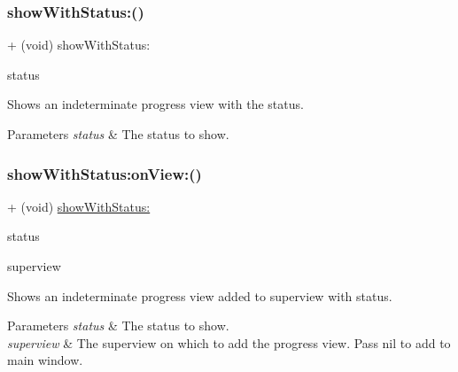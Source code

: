 \subsubsection{\texorpdfstring{show\+With\+Status\+:()}{showWithStatus:()}\hspace{0.1cm}{\footnotesize\ttfamily [3/3]}}
{\footnotesize\ttfamily + (void) show\+With\+Status\+: \begin{DoxyParamCaption}\item[{(N\+S\+String $\ast$)}]{status }\end{DoxyParamCaption}}

Shows an indeterminate progress view with the {\ttfamily status}. 
\begin{DoxyParams}{Parameters}
{\em status} & The status to show. \\
\hline
\end{DoxyParams}
\mbox{\label{interface_k_v_n_progress_ae317161c16121fa1b3dcdb9c1e9f7a8f}} 
\subsubsection{\texorpdfstring{show\+With\+Status\+:on\+View\+:()}{showWithStatus:onView:()}\hspace{0.1cm}{\footnotesize\ttfamily [1/3]}}
{\footnotesize\ttfamily + (void) \mbox{\hyperlink{interface_k_v_n_progress_af86acbff98a05f0ee39e746628b02022}{show\+With\+Status\+:}} \begin{DoxyParamCaption}\item[{(N\+S\+String $\ast$)}]{status }\item[{onView:(U\+I\+View $\ast$)}]{superview }\end{DoxyParamCaption}}

Shows an indeterminate progress view added to {\ttfamily superview} with {\ttfamily status}. 
\begin{DoxyParams}{Parameters}
{\em status} & The status to show. \\
\hline
{\em superview} & The superview on which to add the progress view. Pass {\ttfamily nil} to add to main window. \\
\hline
\end{DoxyParams}
\mbox{\label{interface_k_v_n_progress_ae317161c16121fa1b3dcdb9c1e9f7a8f}} 
